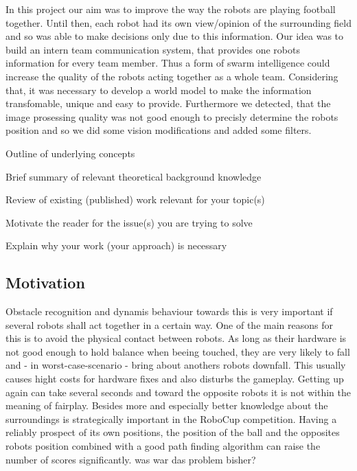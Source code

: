\documentclass[lnicst,a4paper]{svmultln}
\begin{document}
 
In this project our aim was to improve the way the robots are playing football together. Until then, each robot had its own view/opinion of the surrounding field and so was able to make decisions only due to this information. Our idea was to build an intern team communication system, that provides one robots information for every team member. Thus a form of swarm intelligence could increase the quality of the robots   acting together as a whole team. Considering that, it was necessary to develop a world model to make the information transfomable, unique and easy to provide. Furthermore we detected, that the image prosessing quality was not good enough to precisly determine the robots position and so we did some vision modifications and added some filters. 


Outline of underlying concepts

Brief summary of relevant theoretical background knowledge

Review of existing (published) work relevant for your topic(s)

Motivate the reader for the issue(s) you are trying to solve

Explain why your work (your approach) is necessary





\subsection{Motivation}
Obstacle recognition and dynamis behaviour towards this is very important if several robots shall act together in a certain way. One of the main reasons for this is to avoid the physical contact between robots. As long as their hardware is not good enough to hold balance when beeing touched, they are very likely to fall and - in worst-case-scenario - bring about anothers robots downfall. This usually causes hight costs for hardware fixes and also disturbs the gameplay. Getting up again can take several seconds and toward the opposite robots it is not within the meaning of fairplay.
Besides more and especially better knowledge about the surroundings is strategically important in the RoboCup competition. Having a reliably prospect of its own positions, the position of the ball and the opposites robots position combined with a good path finding algorithm can raise the number of scores significantly.
was war das problem bisher?
\end{document}
